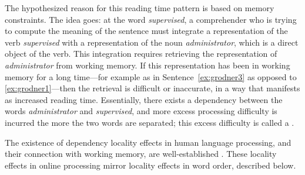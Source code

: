 The hypothesized reason for this reading time pattern is based on memory constraints. The idea goes: at the word \emph{supervised}, a comprehender who is trying to compute the meaning of the sentence must integrate a representation of the verb \emph{supervised} with a representation of the noun \emph{administrator}, which is a direct object of the verb. This integration requires retrieving the representation of \emph{administrator} from working memory. If this representation has been in working memory for a long time---for example as in Sentence~\ref{ex:grodner3} as opposed to \ref{ex:grodner1}---then the retrieval is difficult or inaccurate, in a way that manifests as increased reading time. Essentially, there exists a dependency between the words \emph{administrator} and \emph{supervised}, and more excess processing difficulty is incurred the more the two words are separated; this excess difficulty is called a .

The existence of dependency locality effects in human language processing, and their connection with working memory, are well-established \citep{fedorenko2013direct} . These locality effects in online processing mirror locality effects in word order, described below.







